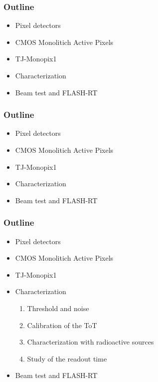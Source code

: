 \documentclass{beamer}
\begin{document}
\begin{frame}[noframenumbering]
    \frametitle{Outline}
    \begin{itemize}
        \item Pixel detectors 
        \item <alert@1> CMOS Monolitich Active Pixels 
        \item TJ-Monopix1
        \item Characterization 
        \item Beam test and FLASH-RT
    \end{itemize}
\end{frame}



\begin{frame}[noframenumbering]
    \frametitle{Outline}
    \begin{itemize}
        \item Pixel detectors 
        \item CMOS Monolitich Active Pixels 
        \item <alert@1> TJ-Monopix1
        \item Characterization 
        \item Beam test and FLASH-RT
    \end{itemize}
\end{frame}


\begin{frame}[noframenumbering]
    \frametitle{Outline}
    \begin{itemize}
        \item Pixel detectors 
        \item CMOS Monolitich Active Pixels 
        \item TJ-Monopix1
        \item <alert@1> Characterization 
        \begin{enumerate}
            \item Threshold and noise
            \item Calibration of the ToT
            \item Characterization with radioactive sources
            \item Study of the readout time
        \end{enumerate}
        \item Beam test and FLASH-RT
    \end{itemize}
\end{frame}

\end{document}
